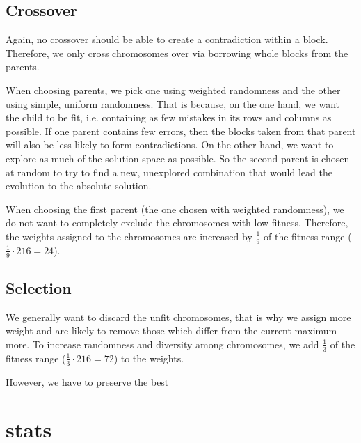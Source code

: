 \documentclass[10pt]{article}
\begin{document}
\subsection{Crossover}
Again, no crossover should be able to create a contradiction within a block. Therefore,
we only cross chromosomes over via borrowing whole blocks from the parents.

When choosing parents, we pick one using weighted randomness and the other using
simple, uniform randomness. That is because, on the one hand, we want the child
to be fit, i.e. containing as few mistakes in its rows and columns as possible.
If one parent contains few errors, then the blocks taken from that parent will also
be less likely to form contradictions.
On the other hand, we want to explore as much of the solution space as possible.
So the second parent is chosen at random to try to find a new, unexplored combination
that would lead the evolution to the absolute solution.

When choosing the first parent (the one chosen with weighted randomness), we do
not want to completely exclude the chromosomes with low fitness. Therefore, the
weights assigned to the chromosomes are increased by $\frac19$ of the fitness range ($\frac19\cdot216=24$).

\subsection{Selection}
We generally want to discard the unfit chromosomes, that is why we assign more
weight and are likely to remove those which differ from the current maximum more.
To increase randomness and diversity among chromosomes, we add $\frac13$ of the
fitness range ($\frac13\cdot216=72$) to the weights.

However, we have to preserve the best

\section{stats}\label{stats}
\end{document}

